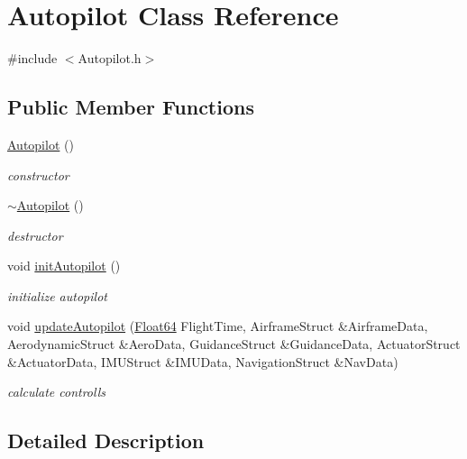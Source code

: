 \hypertarget{class_autopilot}{}\section{Autopilot Class Reference}
\label{class_autopilot}


{\ttfamily \#include $<$Autopilot.\+h$>$}

\subsection*{Public Member Functions}
\begin{DoxyCompactItemize}
\item 
\hyperlink{class_autopilot_a7687901ca400c7f1bd0e1a05cfb8e689}{Autopilot} ()
\begin{DoxyCompactList}\small\item\em constructor \end{DoxyCompactList}\item 
\hyperlink{class_autopilot_a5e0044bf8d2f51f800486ab7e5c2534d}{$\sim$\+Autopilot} ()
\begin{DoxyCompactList}\small\item\em destructor \end{DoxyCompactList}\item 
void \hyperlink{class_autopilot_aea3535a0804c6ae837c737298eaed687}{init\+Autopilot} ()
\begin{DoxyCompactList}\small\item\em initialize autopilot \end{DoxyCompactList}\item 
void \hyperlink{class_autopilot_aa465fd6235f0a8787dee18a9b33c1a40}{update\+Autopilot} (\hyperlink{group___tools_ga3f1431cb9f76da10f59246d1d743dc2c}{Float64} Flight\+Time, Airframe\+Struct \&Airframe\+Data, Aerodynamic\+Struct \&Aero\+Data, Guidance\+Struct \&Guidance\+Data, Actuator\+Struct \&Actuator\+Data, I\+M\+U\+Struct \&I\+M\+U\+Data, Navigation\+Struct \&Nav\+Data)
\begin{DoxyCompactList}\small\item\em calculate controlls \end{DoxyCompactList}\end{DoxyCompactItemize}


\subsection{Detailed Description}


